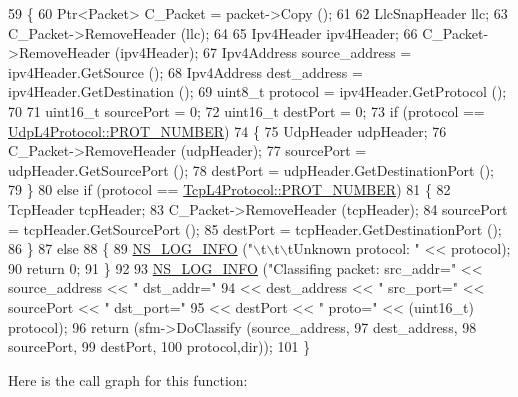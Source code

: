\begin{DoxyCode}
59 \{
60   Ptr<Packet> C\_Packet = packet->Copy ();
61 
62   LlcSnapHeader llc;
63   C\_Packet->RemoveHeader (llc);
64 
65   Ipv4Header ipv4Header;
66   C\_Packet->RemoveHeader (ipv4Header);
67   Ipv4Address source\_address = ipv4Header.GetSource ();
68   Ipv4Address dest\_address = ipv4Header.GetDestination ();
69   uint8\_t protocol = ipv4Header.GetProtocol ();
70 
71   uint16\_t sourcePort = 0;
72   uint16\_t destPort = 0;
73   \textcolor{keywordflow}{if} (protocol == \hyperlink{classns3_1_1UdpL4Protocol_ad370801b3d1a166e831020a777c41047}{UdpL4Protocol::PROT\_NUMBER})
74     \{
75       UdpHeader udpHeader;
76       C\_Packet->RemoveHeader (udpHeader);
77       sourcePort = udpHeader.GetSourcePort ();
78       destPort = udpHeader.GetDestinationPort ();
79     \}
80   \textcolor{keywordflow}{else} \textcolor{keywordflow}{if} (protocol == \hyperlink{classns3_1_1TcpL4Protocol_ac6c1cee44ae21227e755678bb52dbc89}{TcpL4Protocol::PROT\_NUMBER})
81     \{
82       TcpHeader tcpHeader;
83       C\_Packet->RemoveHeader (tcpHeader);
84       sourcePort = tcpHeader.GetSourcePort ();
85       destPort = tcpHeader.GetDestinationPort ();
86     \}
87   \textcolor{keywordflow}{else}
88     \{
89       \hyperlink{group__logging_gafbd73ee2cf9f26b319f49086d8e860fb}{NS\_LOG\_INFO} (\textcolor{stringliteral}{"\(\backslash\)t\(\backslash\)t\(\backslash\)tUnknown protocol: "} << protocol);
90       \textcolor{keywordflow}{return} 0;
91     \}
92 
93   \hyperlink{group__logging_gafbd73ee2cf9f26b319f49086d8e860fb}{NS\_LOG\_INFO} (\textcolor{stringliteral}{"Classifing packet: src\_addr="} << source\_address << \textcolor{stringliteral}{" dst\_addr="}
94                                               << dest\_address << \textcolor{stringliteral}{" src\_port="} << sourcePort << \textcolor{stringliteral}{" dst\_port="}
95                                               << destPort << \textcolor{stringliteral}{" proto="} << (uint16\_t) protocol);
96   \textcolor{keywordflow}{return} (sfm->DoClassify (source\_address,
97                            dest\_address,
98                            sourcePort,
99                            destPort,
100                            protocol,dir));
101 \}
\end{DoxyCode}


Here is the call graph for this function\+:


